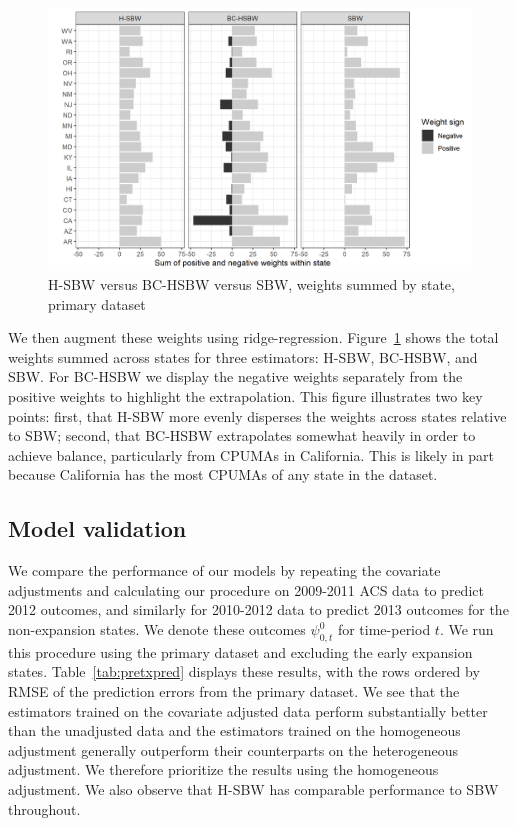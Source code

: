 \documentclass[aoas]{imsart}
\theoremstyle{plain}
\theoremstyle{remark}
\begin{document}
\begin{figure}[H]
\begin{center}
    \caption{H-SBW versus BC-HSBW versus SBW, weights summed by state, primary dataset}
    \label{fig:sbwvhsbw1}
    \includegraphics[scale=0.55]{01_Plots/weights-by-state-sbw-hsbw-c1.png}
\end{center}
\end{figure}

We then augment these weights using ridge-regression. Figure~\ref{fig:sbwvhsbw1} shows the total weights summed across states for three estimators: H-SBW, BC-HSBW, and SBW. For BC-HSBW we display the negative weights separately from the positive weights to highlight the extrapolation. This figure illustrates two key points: first, that H-SBW more evenly disperses the weights across states relative to SBW; second, that BC-HSBW extrapolates somewhat heavily in order to achieve balance, particularly from CPUMAs in California. This is likely in part because California has the most CPUMAs of any state in the dataset.

\subsection{Model validation}\label{sec:validation}

We compare the performance of our models by repeating the covariate adjustments and calculating our procedure on 2009-2011 ACS data to predict 2012 outcomes, and similarly for 2010-2012 data to predict 2013 outcomes for the non-expansion states. We denote these outcomes $\psi^0_{0, t}$ for time-period $t$. We run this procedure using the primary dataset and excluding the early expansion states. Table~\ref{tab:pretxpred} displays these results, with the rows ordered by RMSE of the prediction errors from the primary dataset. We see that the estimators trained on the covariate adjusted data perform substantially better than the unadjusted data and the estimators trained on the homogeneous adjustment generally outperform their counterparts on the heterogeneous adjustment. We therefore prioritize the results using the homogeneous adjustment. We also observe that H-SBW has comparable performance to SBW throughout.
\end{document}
